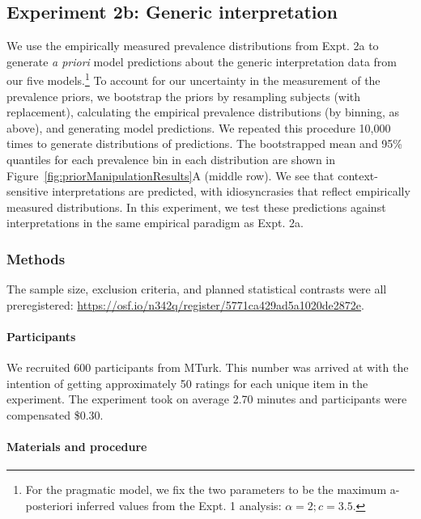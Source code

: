 \documentclass[floatsintext,doc]{apa6}
\let\oldparagraph\paragraph
\renewcommand{\paragraph}[1]{\oldparagraph{#1}\mbox{}}
\let\rmarkdownfootnote\footnote%
\def\footnote{\protect\rmarkdownfootnote}
\begin{document}
\hypertarget{experiment-2b-generic-interpretation}{%
\subsection{Experiment 2b: Generic interpretation}\label{experiment-2b-generic-interpretation}}

We use the empirically measured prevalence distributions from Expt. 2a to generate \emph{a priori} model predictions about the generic interpretation data from our five models.\footnote{For the pragmatic model, we fix the two parameters to be the maximum a-posteriori inferred values from the Expt. 1 analysis: \(\alpha = 2; c = 3.5\).}
To account for our uncertainty in the measurement of the prevalence priors, we bootstrap the priors by resampling subjects (with replacement), calculating the empirical prevalence distributions (by binning, as above), and generating model predictions.
We repeated this procedure 10,000 times to generate distributions of predictions.
The bootstrapped mean and 95\% quantiles for each prevalence bin in each distribution are shown in Figure~\ref{fig:priorManipulationResults}A (middle row).
We see that context-sensitive interpretations are predicted, with idiosyncrasies that reflect empirically measured distributions.
In this experiment, we test these predictions against interpretations in the same empirical paradigm as Expt. 2a.

\hypertarget{methods-3}{%
\subsubsection{Methods}\label{methods-3}}

The sample size, exclusion criteria, and planned statistical contrasts were all preregistered: \url{https://osf.io/n342q/register/5771ca429ad5a1020de2872e}.

\hypertarget{participants-4}{%
\paragraph{Participants}\label{participants-4}}

We recruited 600 participants from MTurk.
This number was arrived at with the intention of getting approximately 50 ratings for each unique item in the experiment.
The experiment took on average 2.70 minutes and participants were compensated \$0.30.

\hypertarget{materials-and-procedure}{%
\paragraph{Materials and procedure}\label{materials-and-procedure}}
\end{document}
